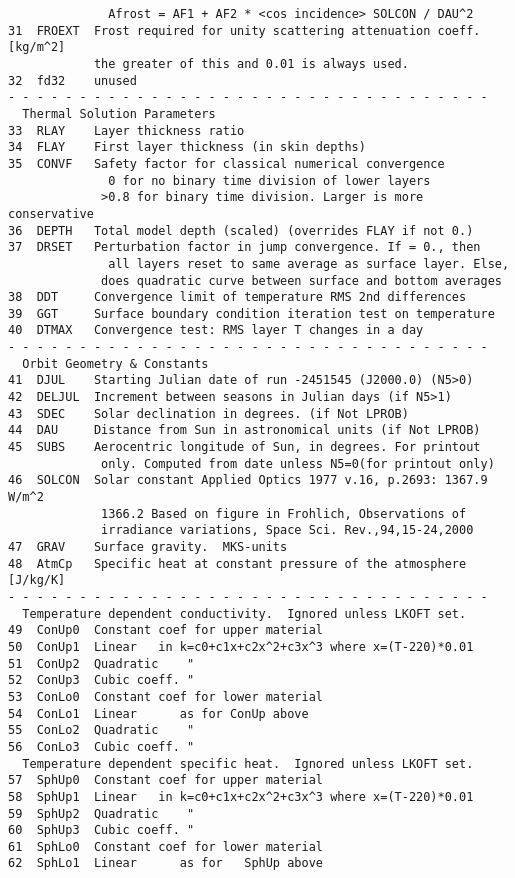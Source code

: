 \documentclass[draft]{article}  %
\begin{document}
\begin{verbatim}
              Afrost = AF1 + AF2 * <cos incidence> SOLCON / DAU^2
31  FROEXT  Frost required for unity scattering attenuation coeff. [kg/m^2]
            the greater of this and 0.01 is always used.
32  fd32    unused
- - - - - - - - - - - - - - - - - - - - - - - - - - - - - - - - - - 
  Thermal Solution Parameters
33  RLAY    Layer thickness ratio
34  FLAY    First layer thickness (in skin depths)
35  CONVF   Safety factor for classical numerical convergence
              0 for no binary time division of lower layers
             >0.8 for binary time division. Larger is more conservative
36  DEPTH   Total model depth (scaled) (overrides FLAY if not 0.)
37  DRSET   Perturbation factor in jump convergence. If = 0., then
              all layers reset to same average as surface layer. Else,
             does quadratic curve between surface and bottom averages
38  DDT     Convergence limit of temperature RMS 2nd differences
39  GGT     Surface boundary condition iteration test on temperature
40  DTMAX   Convergence test: RMS layer T changes in a day
- - - - - - - - - - - - - - - - - - - - - - - - - - - - - - - - - - 
  Orbit Geometry & Constants
41  DJUL    Starting Julian date of run -2451545 (J2000.0) (N5>0)
42  DELJUL  Increment between seasons in Julian days (if N5>1)
43  SDEC    Solar declination in degrees. (if Not LPROB)
44  DAU     Distance from Sun in astronomical units (if Not LPROB)
45  SUBS    Aerocentric longitude of Sun, in degrees. For printout 
             only. Computed from date unless N5=0(for printout only)
46  SOLCON  Solar constant Applied Optics 1977 v.16, p.2693: 1367.9 W/m^2
             1366.2 Based on figure in Frohlich, Observations of 
             irradiance variations, Space Sci. Rev.,94,15-24,2000
47  GRAV    Surface gravity.  MKS-units
48  AtmCp   Specific heat at constant pressure of the atmosphere [J/kg/K]
- - - - - - - - - - - - - - - - - - - - - - - - - - - - - - - - - - 
  Temperature dependent conductivity.  Ignored unless LKOFT set.
49  ConUp0  Constant coef for upper material 
50  ConUp1  Linear   in k=c0+c1x+c2x^2+c3x^3 where x=(T-220)*0.01
51  ConUp2  Quadratic    " 
52  ConUp3  Cubic coeff. "
53  ConLo0  Constant coef for lower material 
54  ConLo1  Linear      as for ConUp above
55  ConLo2  Quadratic    "
56  ConLo3  Cubic coeff. "
  Temperature dependent specific heat.  Ignored unless LKOFT set.
57  SphUp0  Constant coef for upper material 
58  SphUp1  Linear   in k=c0+c1x+c2x^2+c3x^3 where x=(T-220)*0.01
59  SphUp2  Quadratic    " 
60  SphUp3  Cubic coeff. "
61  SphLo0  Constant coef for lower material 
62  SphLo1  Linear      as for   SphUp above

\end{verbatim}
\end{document}
